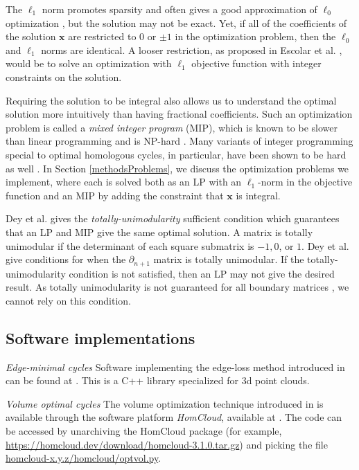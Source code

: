 \documentclass[utf8]{formatting_stuff/frontiersFPHY}
\newcommand{\optimalrep}{\mathbf{x}}
\newcommand{\se}{Section }
\theoremstyle{plain}
\theoremstyle{definition}
\begin{document}
The  $\ell_1$ norm promotes sparsity and often gives a good approximation of $\ell_0$ optimization \cite{dohono,NPhardL0}, but the solution may not be exact. Yet, if all of the coefficients of the solution $\optimalrep$ are restricted to $0$ or $\pm 1$ in the optimization problem, then the $\ell_0$ and $\ell_1$ norms are identical. A looser restriction, as proposed in Escolar et al. \cite{Escolar2016}, would be to solve an optimization with $\ell_1$ objective function with integer constraints on the solution. 


Requiring the solution to be integral also allows us to understand the optimal solution more intuitively than having fractional coefficients. Such an optimization problem is called a \textit{mixed integer program} (MIP), which is known to be slower than linear programming and is NP-hard \cite{Obayashi2018}. Many variants of integer programming special to optimal homologous cycles, in particular, have been shown to be hard as well \cite{borradaile2020minimum}. In \se \ref{methodsProblems}, we discuss the optimization problems we implement, where each is solved both as an LP with an $\ell_1$-norm in the objective function and an MIP by adding the constraint that $\optimalrep$ is integral. 

Dey et al. \cite{dey2011optimal} gives the \textit{totally-unimodularity} sufficient condition which guarantees that an LP and MIP give the same optimal solution. A matrix is totally unimodular if the determinant of each square submatrix is $-1, 0$, or $1$. Dey et al. \cite{dey2011optimal} give conditions for when the $\partial_{n+1}$ matrix is totally unimodular. If the totally-unimodularity condition is not satisfied, then an LP may not give the desired result. As totally unimodularity is not guaranteed for all boundary matrices \cite{henselman2014combinatorial}, we cannot rely on this condition. 

\subsection{Software implementations}
\label{sec:existingimplementations}

\emph{Edge-minimal cycles}  Software implementing the edge-loss method introduced in \cite{Escolar2016} can be found at \cite{OptiPersLP}.  This is a C++ library specialized for 3d point clouds.


\emph{Volume optimal cycles} The volume optimization technique introduced in \cite{Obayashi2018} is available through the software platform \emph{HomCloud}, available at  \cite{homcloud}.  The code can be accessed by unarchiving the HomCloud package  (for example,
\url{https://homcloud.dev/download/homcloud-3.1.0.tar.gz}) and picking the
file \url{homcloud-x.y.z/homcloud/optvol.py}.
\end{document}
